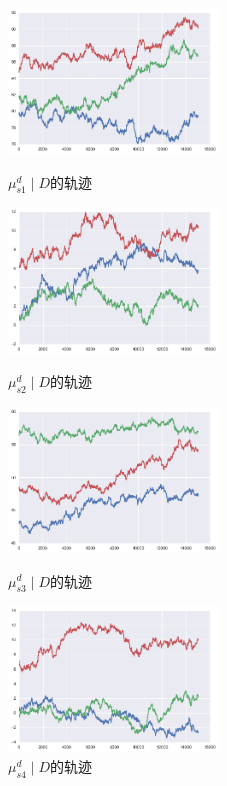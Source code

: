 \documentclass[UTF8]{ctexart}
\begin{document}
\begin{figure}[H]
\begin{minipage}[t]{0.5\linewidth}
\centering
\includegraphics[width=2.2in]{images/gb.png}
\caption{$\mu^d_{s1} \mid D $的轨迹}
\end{minipage}%
\begin{minipage}[t]{0.5\linewidth}
\centering
\includegraphics[width=2.2in]{images/gb2.png}
\caption{$\mu^d_{s2} \mid D$的轨迹}
\end{minipage}
\begin{minipage}[t]{0.5\linewidth}
\centering
\includegraphics[width=2.2in]{images/gb3.png}
\caption{$\mu^d_{s3} \mid D$的轨迹}
\end{minipage}%
\begin{minipage}[t]{0.5\linewidth}
\centering
\includegraphics[width=2.2in]{images/gb4.png}
\caption{$\mu^d_{s4} \mid D的轨迹$}
\end{minipage}
\end{figure}
\end{document}
